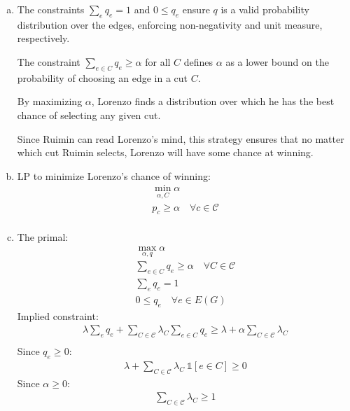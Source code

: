 \documentclass[10pt]{article}
\begin{document}
\begin{solution}

\begin{enumerate}[(a)]
    \item {
        The constraints $\sum_e q_e = 1$ and $0 \leq q_e$ ensure $q$ is a valid 
        probability distribution over the edges, enforcing non-negativity and 
        unit measure, respectively.  

        The constraint $\sum_{e \in C} q_e \geq \alpha$ for all $C$ defines 
        $\alpha$ as a lower bound on the probability of choosing an edge in a 
        cut $C$. 

        By maximizing $\alpha$, Lorenzo finds a distribution over which he has 
        the best chance of selecting any given cut. 

        Since Ruimin can read Lorenzo's mind, this strategy ensures that no 
        matter which cut Ruimin selects, Lorenzo will have some chance at 
        winning. 
    }
    \item {
        LP to minimize Lorenzo's chance of winning:
        \begin{align*}
            \min_{\alpha, C} \alpha \\
            p_c \geq \alpha \quad \forall c \in \mathcal{C} \\
        \end{align*}
    }
    \item {
        The primal:
        \begin{align*}
            \max_{\alpha, q} \alpha \\
            \sum_{e \in C} q_e \geq \alpha  \quad \forall C \in \mathcal{C} \\
            \sum_e q_e = 1 \\
            0 \leq q_e  \quad \forall e \in E(G)
        \end{align*}
        Implied constraint:
        \begin{align*}
            \lambda \sum_e q_e + 
            \sum_{C \in \mathcal{C}} \lambda_C \sum_{e \in C} q_e \geq
            \lambda + \alpha \sum_{C \in \mathcal{C}} \lambda_C \\
        \end{align*}
        Since $q_e \geq 0$:
        \begin{align*}
            \lambda + \sum_{C \in \mathcal{C}} \lambda_C \: \mathbb{1}[e \in C] \geq 0
        \end{align*}
        Since $\alpha \geq 0$:
        \begin{align*}
            \sum_{C \in \mathcal{C}} \lambda_C \geq 1
        \end{align*}
    }
\end{enumerate}

\end{solution}
\end{document}
